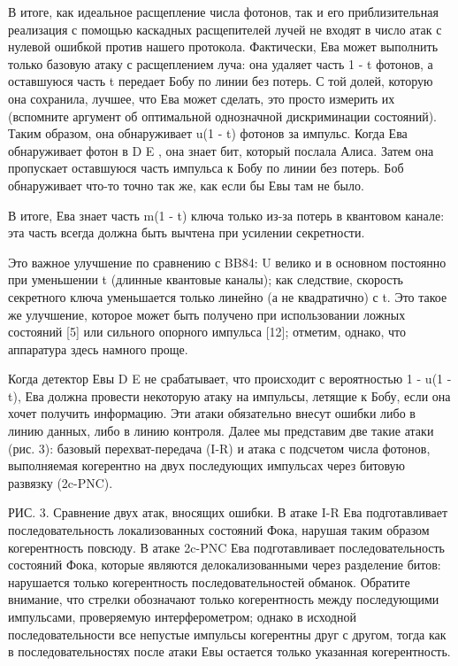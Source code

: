 В итоге, как идеальное расщепление числа фотонов, так и его приблизительная реализация с помощью каскадных расщепителей лучей не входят в число атак с нулевой ошибкой против нашего протокола. Фактически, Ева может выполнить только базовую атаку с расщеплением луча: она удаляет часть 1 - t фотонов, а оставшуюся часть t передает Бобу по линии без потерь. С той долей, которую она сохранила, лучшее, что Ева может сделать, это просто измерить их (вспомните аргумент об оптимальной однозначной дискриминации состояний). Таким образом, она обнаруживает u(1 - t) фотонов за импульс. Когда Ева обнаруживает фотон в D E , она знает бит, который послала Алиса. Затем она пропускает оставшуюся часть импульса к Бобу по линии без потерь. Боб обнаруживает что-то точно так же, как если бы Евы там не было.

В итоге, Ева знает часть m(1 - t) ключа только из-за потерь в квантовом канале: эта часть всегда должна быть вычтена при усилении секретности.


Это важное улучшение по сравнению с BB84: U велико и в основном постоянно при уменьшении t (длинные квантовые каналы); как следствие, скорость секретного ключа уменьшается только линейно (а не квадратично) с t. Это такое же улучшение, которое может быть получено при использовании ложных состояний [5] или сильного опорного импульса [12]; отметим, однако, что аппаратура здесь намного проще.

Когда детектор Евы D E не срабатывает, что происходит с вероятностью 1 - u(1 - t), Ева должна провести некоторую атаку на импульсы, летящие к Бобу, если она хочет получить информацию. Эти атаки обязательно внесут ошибки либо в линию данных, либо в линию контроля. Далее мы представим две такие атаки (рис. 3): базовый перехват-передача (I-R) и атака с подсчетом числа фотонов, выполняемая когерентно на двух последующих импульсах через битовую развязку (2c-PNC).

РИС. 3. Сравнение двух атак, вносящих ошибки. В атаке I-R Ева подготавливает последовательность локализованных состояний Фока, нарушая таким образом когерентность повсюду. В атаке 2c-PNC Ева подготавливает последовательность состояний Фока, которые являются делокализованными через разделение битов: нарушается только когерентность последовательностей обманок. Обратите внимание, что стрелки обозначают только когерентность между последующими импульсами, проверяемую интерферометром; однако в исходной последовательности все непустые импульсы когерентны друг с другом, тогда как в последовательностях после атаки Евы остается только указанная когерентность.

